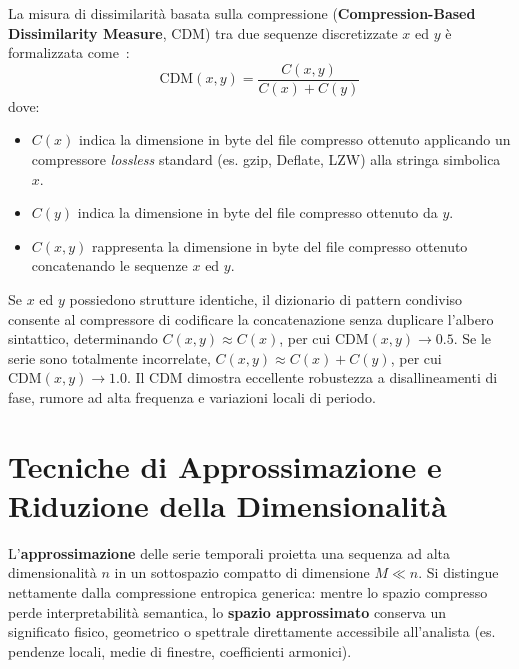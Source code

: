 La misura di dissimilarit\`a basata sulla compressione (\textbf{Compression-Based Dissimilarity Measure}, CDM) tra due sequenze discretizzate $x$ ed $y$ \`e formalizzata come~\cite{keogh2004}:
\begin{equation}
\label{eq:ts-cdm-formula}
\text{CDM}(x, y) = \frac{C(x, y)}{C(x) + C(y)}
\end{equation}
dove:
\begin{itemize}
    \item $C(x)$ indica la dimensione in byte del file compresso ottenuto applicando un compressore \textit{lossless} standard (es. gzip, Deflate, LZW) alla stringa simbolica $x$.
    \item $C(y)$ indica la dimensione in byte del file compresso ottenuto da $y$.
    \item $C(x, y)$ rappresenta la dimensione in byte del file compresso ottenuto concatenando le sequenze $x$ ed $y$.
\end{itemize}

Se $x$ ed $y$ possiedono strutture identiche, il dizionario di pattern condiviso consente al compressore di codificare la concatenazione senza duplicare l'albero sintattico, determinando $C(x,y) \approx C(x)$, per cui $\text{CDM}(x,y) \to 0.5$. Se le serie sono totalmente incorrelate, $C(x,y) \approx C(x) + C(y)$, per cui $\text{CDM}(x,y) \to 1.0$. Il CDM dimostra eccellente robustezza a disallineamenti di fase, rumore ad alta frequenza e variazioni locali di periodo.

\FloatBarrier
\section{Tecniche di Approssimazione e Riduzione della Dimensionalit\`a}
\label{sec:ts-approximation-dimensionality-reduction}

L'\textbf{approssimazione} delle serie temporali proietta una sequenza ad alta dimensionalit\`a $n$ in un sottospazio compatto di dimensione $M \ll n$. Si distingue nettamente dalla compressione entropica generica: mentre lo spazio compresso perde interpretabilit\`a semantica, lo \textbf{spazio approssimato} conserva un significato fisico, geometrico o spettrale direttamente accessibile all'analista (es. pendenze locali, medie di finestre, coefficienti armonici).

